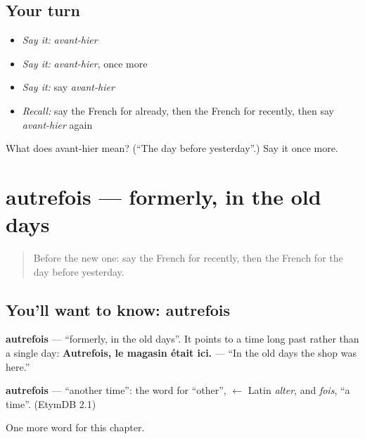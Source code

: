\subsection*{Your turn}
\begin{itemize}
\raggedright
  \item \emph{Say it:} \emph{avant-hier}
  \item \emph{Say it:} \emph{avant-hier}, once more
  \item \emph{Say it:} say \emph{avant-hier}
  \item \emph{Recall:} say the French for already, then the French for recently, then say \emph{avant-hier} again
\end{itemize}

\begin{tcolorbox}[breakable,colback=teal!4,colframe=teal!35!black,title={Before you move on}]
What does avant-hier mean? (\textquotedblleft{}The day before yesterday\textquotedblright{}.) Say it once more.
\end{tcolorbox}
\section[autrefois]{autrefois — formerly, in the old days}

\label{lesson:FR-C140-autrefois}



\begin{quote}
Before the new one: say the French for recently, then the French for the day before yesterday.
\end{quote}

\subsection*{You'll want to know: autrefois}
\textbf{autrefois} — \textquotedblleft{}formerly, in the old days\textquotedblright{}. It points to a time long past rather than a single day: \textbf{Autrefois, le magasin était ici.} — \textquotedblleft{}In the old days the shop was here.\textquotedblright{}

\begin{cousinweb}
\textbf{autrefois} — \textquotedblleft{}another time\textquotedblright{}: the word for \textquotedblleft{}other\textquotedblright{}, $\leftarrow$ Latin \emph{alter}, and \emph{fois}, \textquotedblleft{}a time\textquotedblright{}. (EtymDB 2.1)
\end{cousinweb}

\begin{grammarlens}[title={What you've built}]
One more word for this chapter.
\end{grammarlens}

